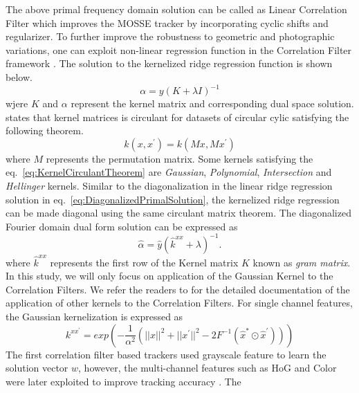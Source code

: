 \documentclass[10pt,twocolumn,letterpaper]{article}
\newcounter{ct}
\begin{document}
The above primal frequency domain solution can be called as Linear
Correlation Filter which improves the MOSSE tracker by incorporating
cyclic shifts and regularizer. To further improve the robustness to
geometric and photographic variations, one can exploit non-linear
regression function in the Correlation Filter framework
\cite{henriques2015high}. The solution to the kernelized ridge
regression function is shown below.
\begin{equation}
\alpha = y(K+\lambda I)^{-1}
\end{equation}
wjere $K$ and $\alpha$ represent the kernel matrix and corresponding
dual space solution. \cite{henriques2015high} states that kernel
matrices is circulant for datasets of circular cylic satisfying the
following theorem.
\begin{equation}
k(x,x^{'}) = k(Mx,Mx^{'})
\label{eq:KernelCirculantTheorem}
\end{equation}
where $M$ represents the permutation matrix. Some kernels satisfying
the eq.~\ref{eq:KernelCirculantTheorem} are \textit{Gaussian},
\textit{Polynomial}, \textit{Intersection} and \textit{Hellinger}
kernels. Similar to the diagonalization in the linear ridge regression
solution in eq.~\ref{eq:DiagonalizedPrimalSolution}, the kernelized
ridge regression can be made diagonal using the same circulant matrix
theorem.  The diagonalized Fourier domain dual form solution can be
expressed as
\begin{equation}
\hat{\alpha} = \hat{y}(\hat{k}^{xx}+\lambda)^{-1}
\label{eq:FourierDualDomainSolution}.
\end{equation}
where $\hat{k}^{xx}$ represents the first row of the Kernel matrix $K$
known as \textit{gram matrix}. In this study, we will only focus on
application of the Gaussian Kernel to the Correlation Filters. We
refer the readers to \cite{henriques2015high} for the detailed
documentation of the application of other kernels to the Correlation
Filters. For single channel features, the Gaussian kernelization is
expressed as
\begin{equation}
k^{xx^{'}} = exp(-\dfrac{1}{\alpha^{2}}(||x||^{2}+||x^{'}||^{2}-2F^{-1}(\hat{x}^{*}\odot \hat{x}^{'})))
\label{eq:GaussianCorrelationSingleChannel}
\end{equation}
The first correlation filter based trackers used grayscale feature to
learn the solution vector $w$, however, the multi-channel features
such as HoG and Color were later exploited to improve tracking
accuracy
\cite{henriques2015high,galoogahi2013multi,tang2015multi,ma2015long,bibi2015multi}. The
\end{document}
